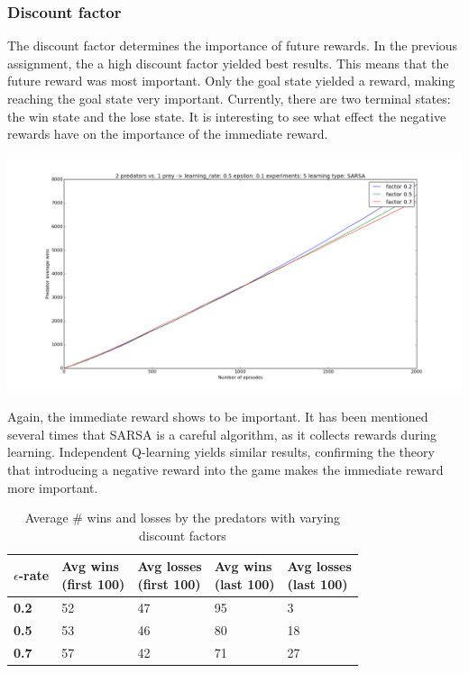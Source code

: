 \subsubsection{Discount factor}
The discount factor determines the importance of future rewards. In the previous assignment, the a high discount factor yielded best results. This means that the future reward was most important. Only the goal state yielded a reward, making reaching the goal state very important. Currently, there are two terminal states: the win state and the lose state. It is interesting to see what effect the negative rewards have on the importance of the immediate reward.

\begin{center}
	\includegraphics[scale=0.3]{2_predators_discount_factor_SARSA}
\end{center}

Again, the immediate reward shows to be important. It has been mentioned several times that SARSA is a careful algorithm, as it collects rewards during learning. Independent Q-learning yields similar results, confirming the theory that introducing a negative reward into the game makes the immediate reward more important.

\begin{table}[H]
\begin{center}
\begin{tabular}{| l | l | l | l | l |}
\hline
\parbox{2cm}{\textbf{$\epsilon$-rate}} & \parbox{2cm}{\textbf{Avg wins \\ (first 100)}} & \parbox{2cm}{\textbf{Avg losses \\ (first 100)}} & \parbox{2cm}{\textbf{Avg wins \\ (last 100)}} & \parbox{2cm}{\textbf{Avg losses \\ (last 100)}} \\
\hline
\textbf{0.2} & 52 & 47 & 95 & 3 \\
\hline
\textbf{0.5} & 53 & 46 & 80 & 18 \\
\hline
\textbf{0.7} & 57 & 42 & 71 & 27 \\
\hline
\end{tabular}
\caption{Average \# wins and losses by the predators with varying discount factors}
\end{center}
\end{table}

